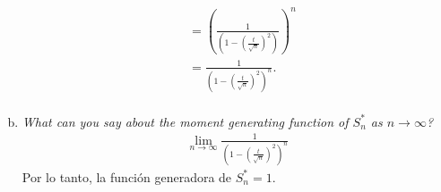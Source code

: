 \documentclass{article}
\begin{document}
\begin{enumerate}[a)]
\begin{align}
                & = \left(\frac{1}{\left(1-\left(\frac{t}{\sqrt{n}}\right)^2\right)} \right)^n \\ \nonumber
                & = \frac{1}{\left(1-\left(\frac{t}{\sqrt{n}}\right)^2\right)^n}.  \\ \nonumber
    \end{align}
    \item \textit{What can you say about the moment generating function of $S_{n}^{*}$ as $n \longrightarrow \infty$?}
        \begin{align}
        \nonumber
        \lim_{n \to \infty}\frac{1}{\left(1-\left(\frac{t}{\sqrt{n}}\right)^2\right)^n}\nonumber
    \end{align}
Por lo tanto, la función generadora de  $S_{n}^{*} = 1$.
\end{enumerate}





\end{document}
